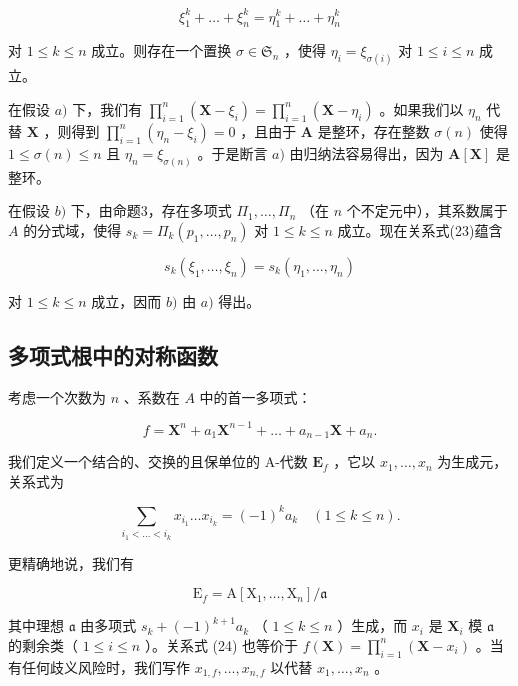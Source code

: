 \[
\xi_ {1} ^ {k} + \dots + \xi_ {n} ^ {k} = \eta_ {1} ^ {k} + \dots + \eta_ {n} ^ {k}\tag{23}
\]

对 \(1 \leqslant k \leqslant n\) 成立。则存在一个置换 \(\sigma \in \mathfrak{S}_n\) ，使得 \(\eta_i = \xi_{\sigma(i)}\) 对 \(1 \leqslant i \leqslant n\) 成立。

在假设 \(a)\) 下，我们有 \(\prod_{i=1}^{n} (\mathbf{X} - \xi_i) = \prod_{i=1}^{n} (\mathbf{X} - \eta_i)\) 。如果我们以 \(\eta_n\) 代替 \(\mathbf{X}\) ，则得到 \(\prod_{i=1}^{n} (\eta_n - \xi_i) = 0\) ，且由于 \(\mathbf{A}\) 是整环，存在整数 \(\sigma(n)\) 使得 \(1 \leqslant \sigma(n) \leqslant n\) 且 \(\eta_n = \xi_{\sigma(n)}\) 。于是断言 \(a)\) 由归纳法容易得出，因为 \(\mathbf{A}[\mathbf{X}]\) 是整环。

在假设 \(b)\) 下，由命题3，存在多项式 \(\Pi_1, \ldots, \Pi_n\) （在 \(n\) 个不定元中），其系数属于 \(A\) 的分式域，使得 \(s_k = \Pi_k(p_1, \ldots, p_n)\) 对 \(1 \leqslant k \leqslant n\) 成立。现在关系式(23)蕴含

\[
s _ {k} (\xi_ {1}, \dots , \xi_ {n}) = s _ {k} (\eta_ {1}, \dots , \eta_ {n})
\]

对 \(1 \leqslant k \leqslant n\) 成立，因而 \(b)\) 由 \(a)\) 得出。

\subsection{多项式根中的对称函数}

考虑一个次数为 \(n\) 、系数在 \(A\) 中的首一多项式：

\[
f = \mathbf {X} ^ {n} + a _ {1} \mathbf {X} ^ {n - 1} + \dots + a _ {n - 1} \mathbf {X} + a _ {n}.
\]

我们定义一个结合的、交换的且保单位的 A-代数 \(\mathbf{E}_f\) ，它以 \(x_{1},\ldots ,x_{n}\) 为生成元，关系式为

\[
\sum_ {i _ {1} <   \dots <   i _ {k}} x _ {i _ {1}} \dots x _ {i _ {k}} = (- 1) ^ {k} a _ {k} \quad (1 \leqslant k \leqslant n).\tag{24}
\]

更精确地说，我们有

\[
\mathrm{E} _ {f} = \mathrm{A} [ \mathrm{X} _ {1}, \dots , \mathrm{X} _ {n} ] / \mathfrak {a}
\]

其中理想 \(\mathfrak{a}\) 由多项式 \(s_k + (-1)^{k+1} a_k\) （ \(1 \leqslant k \leqslant n\) ）生成，而 \(x_i\) 是 \(\mathbf{X}_i\) 模 \(\mathfrak{a}\) 的剩余类（ \(1 \leqslant i \leqslant n\) ）。关系式 (24) 也等价于 \(f(\mathbf{X}) = \prod_{i=1}^{n} (\mathbf{X} - x_i)\) 。当有任何歧义风险时，我们写作 \(x_{1,f}, \ldots, x_{n,f}\) 以代替 \(x_1, \ldots, x_n\) 。

